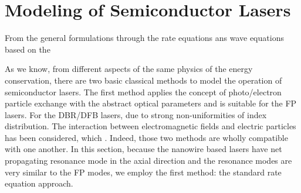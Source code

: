 %
%
%
\section{Modeling of Semiconductor Lasers} \label{corrections}

From the general formulations through the rate equations ans wave equations
based on the

As we know, from different aspects of the same physics of the energy
conservation, there are two basic classical methods to model the operation of
semiconductor lasers. The first method applies the
concept of photo/electron particle exchange with the abstract optical parameters
and is suitable for the FP lasers. For the DBR/DFB lasers, due to strong
non-uniformities of index distribution. The interaction between electromagnetic
fields and electric particles has been considered, which . Indeed, those two
methods are wholly compatible with one another. In this section, because the nanowire based lasers have net propagating resonance mode in the axial direction and the resonance modes are very similar to
the FP modes, we employ the first method: the standard rate
equation approach.

